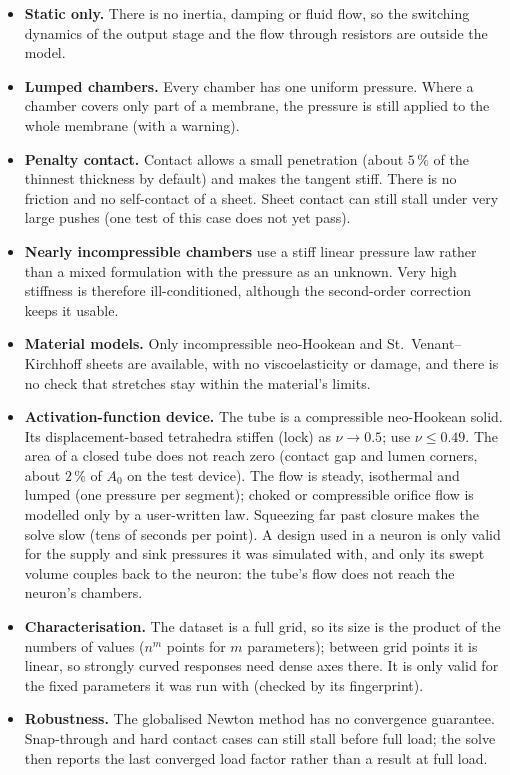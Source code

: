 \documentclass[11pt,a4paper]{article}
\theoremstyle{remark}
\begin{document}
\begin{itemize}
\item \textbf{Static only.} There is no inertia, damping or fluid flow, so the switching dynamics
      of the output stage and the flow through resistors are outside the model.
\item \textbf{Lumped chambers.} Every chamber has one uniform pressure. Where a chamber covers only
      part of a membrane, the pressure is still applied to the whole membrane (with a warning).
\item \textbf{Penalty contact.} Contact allows a small penetration (about $5\,\%$ of the thinnest
      thickness by default) and makes the tangent stiff. There is no friction and no
      self-contact of a sheet. Sheet contact can still stall under very large pushes (one test of
      this case does not yet pass).
\item \textbf{Nearly incompressible chambers} use a stiff linear pressure law rather than a mixed
      formulation with the pressure as an unknown. Very high stiffness is therefore
      ill-conditioned, although the second-order correction keeps it usable.
\item \textbf{Material models.} Only incompressible neo-Hookean and St.\ Venant--Kirchhoff sheets are
      available, with no viscoelasticity or damage, and there is no check that stretches stay
      within the material's limits.
\item \textbf{Activation-function device.} The tube is a compressible neo-Hookean solid. Its
      displacement-based tetrahedra stiffen (lock) as $\nu \to 0.5$; use $\nu \le 0.49$. The
      area of a closed tube does not reach zero (contact gap and lumen corners, about $2\,\%$ of $A_0$
      on the test device). The flow is steady, isothermal and lumped (one pressure per segment); choked
      or compressible orifice flow is modelled only by a user-written law. Squeezing far past closure makes the
      solve slow (tens of seconds per point). A design used in a neuron is only valid for the supply
      and sink pressures it was simulated with, and only its swept volume couples back to the neuron:
      the tube's flow does not reach the neuron's chambers.
\item \textbf{Characterisation.} The dataset is a full grid, so its size is the product of the
      numbers of values ($n^m$ points for $m$ parameters); between grid points it is linear, so
      strongly curved responses need dense axes there. It is only valid for the fixed parameters it
      was run with (checked by its fingerprint).
\item \textbf{Robustness.} The globalised Newton method has no convergence guarantee. Snap-through
      and hard contact cases can still stall before full load; the solve then reports the last
      converged load factor rather than a result at full load.
\end{itemize}
\end{document}
